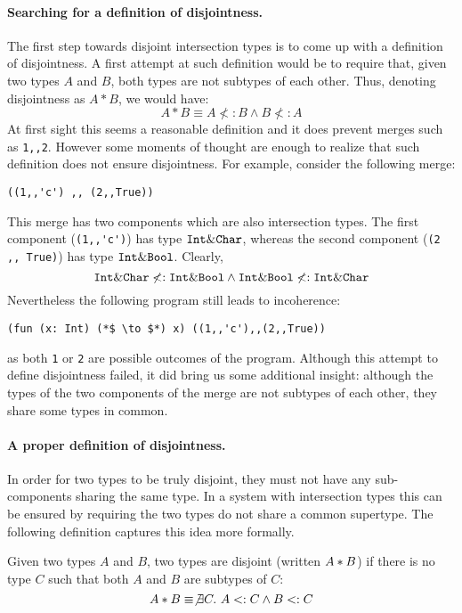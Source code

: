 \paragraph{Searching for a definition of disjointness.}
The first step towards disjoint intersection types is to come up
with a definition of disjointness. A first attempt at such definition would
be to require that, given two types $A$ and $B$, both types are not
subtypes of each other. Thus, denoting disjointness as $A * B$, we would have:
\[A * B \equiv A \not<: B \wedge B \not<: A\]
At first sight this seems a reasonable definition and it does prevent
merges such as \lstinline{1,,2}. However some moments of thought are enough to realize that
such definition does not ensure disjointness. For example, consider
the following merge:

\begin{lstlisting}
((1,,'c') ,, (2,,True))
\end{lstlisting}

\noindent This merge has two components which are also intersection
types. The first component (\lstinline{(1,,'c')}) has type $\texttt{Int} \&
\texttt{Char}$, whereas the second component (\lstinline{(2 ,, True)}) has type
$\texttt{Int} \& \texttt{Bool}$. Clearly,
\[ \texttt{Int} \& \texttt{Char} \not <: \texttt{Int} \& \texttt{Bool} \wedge \texttt{Int} \& \texttt{Bool} \not <: \texttt{Int} \& \texttt{Char} \]
Nevertheless the following program still leads to
incoherence:
\begin{lstlisting}
(fun (x: Int) (*$ \to $*) x) ((1,,'c'),,(2,,True))
\end{lstlisting}
as both \lstinline{1} or \lstinline{2} are possible outcomes
of the program. Although this attempt to define disjointness failed,
it did bring us some additional insight: although the types of the two
components of the merge are not subtypes of each other, they share
some types in common.

\paragraph{A proper definition of disjointness.} In order for two types
to be truly disjoint, they must not have any sub-components sharing
the same type. In a system with intersection types this can be ensured
by requiring the two types do not share a common supertype. The
following definition captures this idea more formally.

\begin{definition}[Disjointness]
  Given two types $A$ and $B$, two types are disjoint
  (written $A * B$) if there is no type $C$ such that both $A$ and $B$ are
  subtypes of $C$:
  \[A * B \equiv \not\exists C.~A <: C \wedge B <: C\]
\end{definition}

